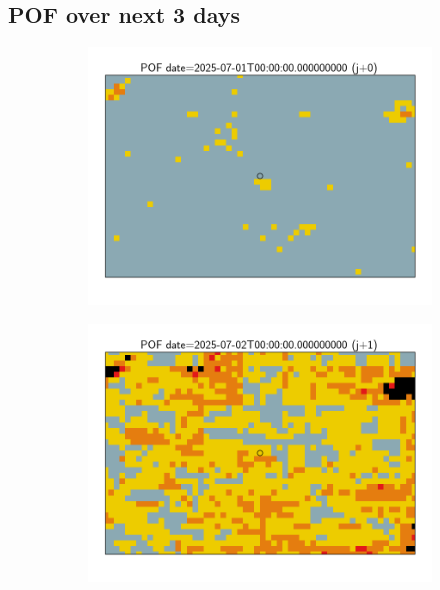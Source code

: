 \documentclass{article}
\begin{document}
\subsection*{POF over next 3 days}
\vspace{-1em}
\begin{figure}[H]
    \centering
    \begin{subfigure}[b]{0.31\textwidth}
        \centering
        \includegraphics[width=\linewidth]{pof_256_j0.png} %
    \end{subfigure}
    \begin{subfigure}[b]{0.31\textwidth}
        \centering
        \includegraphics[width=\linewidth]{pof_256_j1.png} %

\end{subfigure}
\end{figure}
\end{document}
